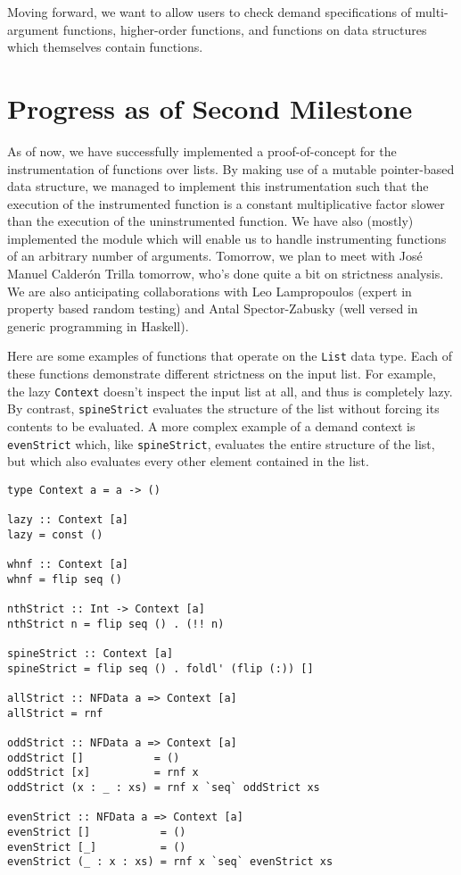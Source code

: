 \documentclass{article}
\begin{document}
Moving forward, we want to allow users to check demand specifications of
multi-argument functions, higher-order functions, and functions on data
structures which themselves contain functions.

\section{Progress as of Second Milestone}

As of now, we have successfully implemented a proof-of-concept for the
instrumentation of functions over lists. By making use of a mutable
pointer-based data structure, we managed to implement this instrumentation such
that the execution of the instrumented function is a constant multiplicative
factor slower than the execution of the uninstrumented function. We have also
(mostly) implemented the module which will enable us to handle instrumenting
functions of an arbitrary number of arguments. Tomorrow, we plan to meet with
Jos\'e Manuel Calder\'on Trilla tomorrow, who's done quite a bit on strictness
analysis. We are also anticipating collaborations with Leo Lampropoulos (expert
in property based random testing) and Antal Spector-Zabusky (well versed in
generic programming in Haskell).

Here are some examples of functions that operate on the \verb|List| data type.
Each of these functions demonstrate different strictness on the input list. For
example, the lazy \verb|Context| doesn't inspect the input list at all, and thus
is completely lazy. By contrast, \verb|spineStrict| evaluates the structure of
the list without forcing its contents to be evaluated. A more complex example of
a demand context is \verb|evenStrict| which, like \verb|spineStrict|, evaluates
the entire structure of the list, but which also evaluates every other element
contained in the list.

\begin{verbatim}
type Context a = a -> ()

lazy :: Context [a]
lazy = const ()

whnf :: Context [a]
whnf = flip seq ()

nthStrict :: Int -> Context [a]
nthStrict n = flip seq () . (!! n)

spineStrict :: Context [a]
spineStrict = flip seq () . foldl' (flip (:)) []

allStrict :: NFData a => Context [a]
allStrict = rnf

oddStrict :: NFData a => Context [a]
oddStrict []           = ()
oddStrict [x]          = rnf x
oddStrict (x : _ : xs) = rnf x `seq` oddStrict xs

evenStrict :: NFData a => Context [a]
evenStrict []           = ()
evenStrict [_]          = ()
evenStrict (_ : x : xs) = rnf x `seq` evenStrict xs
\end{verbatim}
\end{document}
